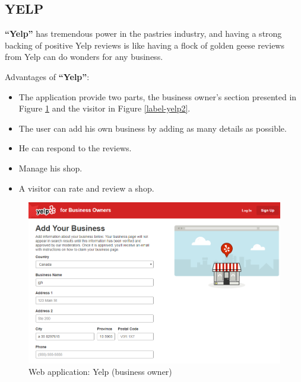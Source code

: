 \documentclass[12pt,a4paper]{report}
\begin{document}
	\subsection{YELP}
	\textbf{``Yelp''} has tremendous power in the pastries industry, and having a strong backing of positive Yelp reviews is like having a flock of golden geese reviews from Yelp can do wonders for any business.\par 
	Advantages of \textbf{``Yelp''}:
	\begin{itemize}
		\item The application provide two parts, the business owner's section presented in Figure \ref{label-yelp1} and the visitor in Figure \ref{label-yelp2}.
		\item  The user can add his own business by adding as many details as possible.
		\item He can respond to the reviews.
		\item Manage his shop.
		\item A visitor can rate and review a shop.
		
	\end{itemize}
	\begin{figure}[H]
		\centering
		\includegraphics[width=5in,keepaspectratio]{yelp.png}
		\caption{Web application: Yelp (business owner)\protect{}\protect\footnotemark[\thefootnote]}
		
		
		\label{label-yelp1}
	\end{figure}
\end{document}
